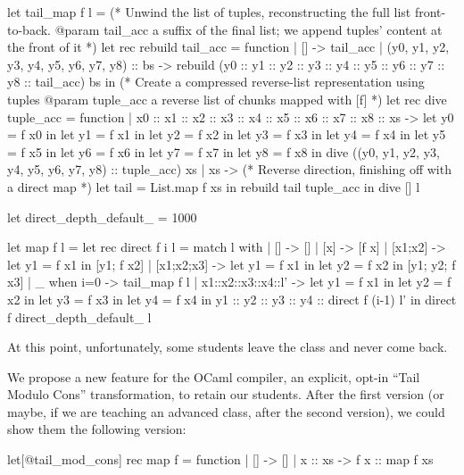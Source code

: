 \begin{minipage}{0.6\linewidth}
\begin{Ocaml}[basicstyle=\ttfamily\tiny]
let tail_map f l =
  (* Unwind the list of tuples, reconstructing the full list front-to-back.
     @param tail_acc a suffix of the final list; we append tuples' content
     at the front of it *)
  let rec rebuild tail_acc = function
    | [] -> tail_acc
    | (y0, y1, y2, y3, y4, y5, y6, y7, y8) :: bs ->
      rebuild (y0 :: y1 :: y2 :: y3 :: y4 :: y5 :: y6 :: y7 :: y8 :: tail_acc) bs
  in
  (* Create a compressed reverse-list representation using tuples
     @param tuple_acc a reverse list of chunks mapped with [f] *)
  let rec dive tuple_acc = function
    | x0 :: x1 :: x2 :: x3 :: x4 :: x5 :: x6 :: x7 :: x8 :: xs ->
      let y0 = f x0 in let y1 = f x1 in let y2 = f x2 in
      let y3 = f x3 in let y4 = f x4 in let y5 = f x5 in
      let y6 = f x6 in let y7 = f x7 in let y8 = f x8 in
      dive ((y0, y1, y2, y3, y4, y5, y6, y7, y8) :: tuple_acc) xs
    | xs ->
      (* Reverse direction, finishing off with a direct map *)
      let tail = List.map f xs in
      rebuild tail tuple_acc
  in
  dive [] l
\end{Ocaml}
\end{minipage}
\hfill
\begin{minipage}{0.4\linewidth}
\begin{Ocaml}[basicstyle=\ttfamily\tiny]
let direct_depth_default_ = 1000

let map f l =
  let rec direct f i l = match l with
    | [] -> []
    | [x] -> [f x]
    | [x1;x2] -> let y1 = f x1 in [y1; f x2]
    | [x1;x2;x3] ->
      let y1 = f x1 in let y2 = f x2 in [y1; y2; f x3]
    | _ when i=0 -> tail_map f l
    | x1::x2::x3::x4::l' ->
      let y1 = f x1 in
      let y2 = f x2 in
      let y3 = f x3 in
      let y4 = f x4 in
      y1 :: y2 :: y3 :: y4 :: direct f (i-1) l'
  in
  direct f direct_depth_default_ l
\end{Ocaml}
\end{minipage}
\lstset{basicstyle=\small\ttfamily}

At this point, unfortunately, some students leave the class and never
come back.

We propose a new feature for the OCaml compiler, an explicit, opt-in
``Tail Modulo Cons'' transformation, to retain our students. After the
first version (or maybe, if we are teaching an advanced class, after
the second version), we could show them the following version:
\begin{Ocaml}
let[@tail_mod_cons] rec map f = function
| [] -> []
| x :: xs -> f x :: map f xs
\end{Ocaml}

